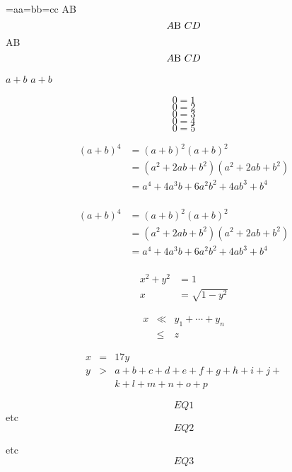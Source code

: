 \documentclass[useallsizes]{\myclass}
\providecommand\xbox[1]{\hbox}
\begin{document}
{\everyhbox={aa}\everyvbox={bb}\everyxbox={cc} \everymath{\alpha}
 \everydisplay{\beta}
\xbox{foo}{\hbox{A\vbox{B}}\hbox{}}
$$ A\hbox{B $C$} D$$
}\xbox{foo}{\hbox{A\vbox{B}}\hbox{}}
$$ A\hbox{B $C$} D$$

$a+b$ $a\mathbin+b$

\begin{equation} 0=1 \end{equation}
\begin{equation*} 0=2 \end{equation*}
\begin{displaymath} 0=3 \end{displaymath}
\[ 0=4 \]
$$ 0 = 5 $$

\begin{equation}
\begin{split}
(a+b)^4 &= (a+b)^ 2 (a+b)^2           \\
        &= (a^2+2ab+b^2)(a^2+2ab+b^2) \\
        &= a^4+4a^3b+6a^2b^2+4ab^3+b^4 \\
\end{split}
\end{equation}


\begin{equation}
\begin{aligned}
(a+b)^4 &= (a+b)^ 2 (a+b)^2           \\
        &= (a^2+2ab+b^2)(a^2+2ab+b^2) \\
        &= a^4+4a^3b+6a^2b^2+4ab^3+b^4 \\
\end{aligned}
\end{equation}


\begin{align}
x^2+y^2&=1\\ x&=\sqrt{1-y^2}
\end{align}

\begin{eqnarray*}
x & \ll & y_{1} + \cdots + y_{n} \\
  & \leq &z
\end{eqnarray*}

\begin{eqnarray}
x & = &17y \\
y & > & a + b + c+d+e+f+g+h+i+j+ \\
  &   & k+l+m+n+o+p
\end{eqnarray}

$$EQ1$$ etc
$$EQ2$$ \par etc
$$EQ3$$ 
\end{document}
